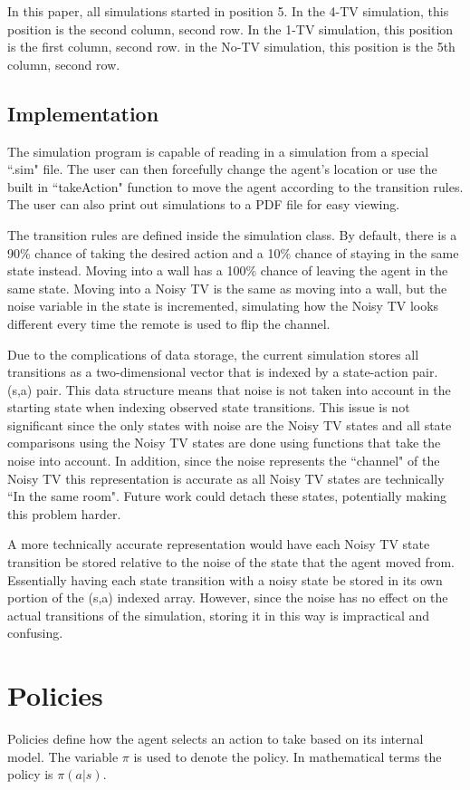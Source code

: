 \documentclass[12pt]{thesis}
\begin{document}
In this paper, all simulations started in position 5. In the 4-TV simulation, this position is the second column, second row. In the 1-TV simulation, this position is the first column, second row. in the No-TV simulation, this position is the 5th column, second row.
\subsection{Implementation}
The simulation program is capable of reading in a simulation from a special ``.sim" file. The user can then forcefully change the agent's location or use the built in ``takeAction" function to move the agent according to the transition rules. The user can also print out simulations to a PDF file for easy viewing.

The transition rules are defined inside the simulation class. By default, there is a 90\% chance of taking the desired action and a 10\% chance of staying in the same state instead. Moving into a wall has a 100\% chance of leaving the agent in the same state. Moving into a Noisy TV is the same as moving into a wall, but the noise variable in the state is incremented, simulating how the Noisy TV looks different every time the remote is used to flip the channel.

Due to the complications of data storage, the current simulation stores all transitions as a two-dimensional vector that is indexed by a state-action pair. (s,a) pair. This data structure means that noise is not taken into account in the starting state when indexing observed state transitions. This issue is not significant since the only states with noise are the Noisy TV states and all state comparisons using the Noisy TV states are done using functions that take the noise into account. In addition, since the noise represents the ``channel" of the Noisy TV this representation is accurate as all Noisy TV states are technically ``In the same room". Future work could detach these states, potentially making this problem harder.

A more technically accurate representation would have each Noisy TV state transition be stored relative to the noise of the state that the agent moved from. Essentially having each state transition with a noisy state be stored in its own portion of the (s,a) indexed array. However, since the noise has no effect on the actual transitions of the simulation, storing it in this way is impractical and confusing.

\section{Policies}
Policies define how the agent selects an action to take based on its internal model. The variable $\pi$ is used to denote the policy. In mathematical terms the policy is $\pi(a | s)$.
\end{document}
